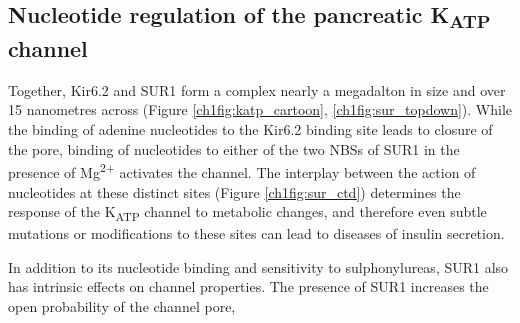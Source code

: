 \subsection{Nucleotide regulation of the pancreatic K\textsubscript{ATP} channel}

Together, Kir6.2 and SUR1 form a complex nearly a megadalton in size and over 15 nanometres across (Figure \ref{ch1fig:katp_cartoon}, \ref{ch1fig:sur_topdown}).
While the binding of adenine nucleotides to the Kir6.2 binding site leads to closure of the pore, binding of nucleotides to either of the two NBSs of SUR1 in the presence of Mg\textsuperscript{2+} activates the channel.
The interplay between the action of nucleotides at these distinct sites (Figure \ref{ch1fig:sur_ctd}) determines the response of the K\textsubscript{ATP} channel to metabolic changes, and therefore even subtle mutations or modifications to these sites can lead to diseases of insulin secretion.

In addition to its nucleotide binding and sensitivity to sulphonylureas, SUR1 also has intrinsic effects on channel properties.
The presence of SUR1 increases the open probability of the channel pore,


